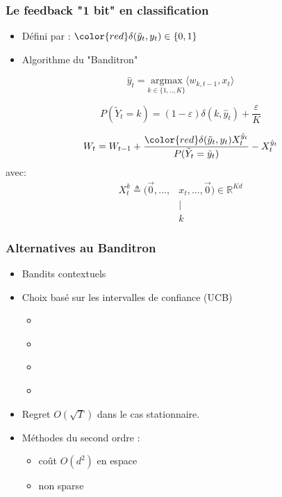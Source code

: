 \documentclass{beamer}
\begin{document}
\begin{frame}
	\frametitle{Le feedback "1 bit" en classification}
	\begin{itemize}
		\item Défini par \cite{kakade2008efficient} : ${\color{red}\delta(\tilde{y}_t ,y_t)} \in \{0,1\}$
		\item Algorithme du "Banditron"
	\end{itemize}
	
	\begin{equation*}\label{eq:argmax}
	\hat{y}_t = \underset{k \in\{1,..,K\}}{\text{argmax}}  \langle w_{k, t-1}, x_t \rangle
	\end{equation*}
	
	\begin{equation*}\label{eq:eps-greedy}
	P(\tilde{Y}_t=k) = (1-\varepsilon) \delta(k,\hat{y}_t) + \frac{\varepsilon}{K}
	\end{equation*}
	
	\begin{equation*} \label{eq:banditron-update}
	W_t = W_{t-1} + \frac{{\color{red}\delta(\tilde{y}_t ,y_t)} X_t^{\tilde{y}_t}}{P(\tilde{Y}_t=\tilde{y}_t)} - X_t^{\hat{y}_t}
	\end{equation*}   
	avec:
	\begin{align*}\label{eq:X}
	X_t^k \triangleq (\vec{0}, ..., & x_t, ..., \vec{0}) \in \mathbb{R}^{K d}\\
	&\mid\nonumber\\
	&k\nonumber
	\end{align*}
\end{frame}

\begin{frame}\frametitle{Alternatives au Banditron}
	\begin{itemize}
		\item Bandits contextuels
		\item Choix basé sur les intervalles de confiance (UCB)
		\begin{itemize}
		 \item\cite{li2010contextual}
		 \item\cite{hazan2011newtron}
		 \item\cite{crammer2013multiclass}
		 \item\cite{ngo2013upper}
		 \end{itemize}
		\item Regret $O(\sqrt{T})$ dans le cas stationnaire.
		\item Méthodes du second ordre :
		\begin{itemize}
			\item coût $O(d^2)$ en espace
			\item non sparse
		\end{itemize}
	\end{itemize}
	
\end{frame}
	




\end{document}
